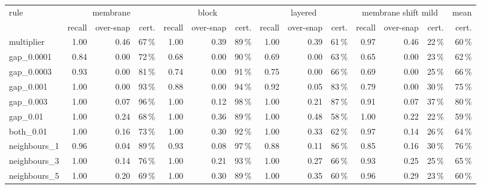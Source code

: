 \begin{tabular}{lrrrrrrrrrrrrr}
\hline
rule & \multicolumn{3}{c}{membrane} & \multicolumn{3}{c}{block} & \multicolumn{3}{c}{layered} & \multicolumn{3}{c}{membrane shift mild} & mean \\
 & recall & over-snap & cert. & recall & over-snap & cert. & recall & over-snap & cert. & recall & over-snap & cert. & cert. \\
\hline
multiplier & 1.00 & 0.46 & 67\,\% & 1.00 & 0.39 & 89\,\% & 1.00 & 0.39 & 61\,\% & 0.97 & 0.46 & 22\,\% & 60\,\% \\
gap\_0.0001 & 0.84 & 0.00 & 72\,\% & 0.68 & 0.00 & 90\,\% & 0.69 & 0.00 & 63\,\% & 0.65 & 0.00 & 23\,\% & 62\,\% \\
gap\_0.0003 & 0.93 & 0.00 & 81\,\% & 0.74 & 0.00 & 91\,\% & 0.75 & 0.00 & 66\,\% & 0.69 & 0.00 & 25\,\% & 66\,\% \\
gap\_0.001 & 1.00 & 0.00 & 93\,\% & 0.88 & 0.00 & 94\,\% & 0.92 & 0.05 & 83\,\% & 0.79 & 0.00 & 30\,\% & 75\,\% \\
gap\_0.003 & 1.00 & 0.07 & 96\,\% & 1.00 & 0.12 & 98\,\% & 1.00 & 0.21 & 87\,\% & 0.91 & 0.07 & 37\,\% & 80\,\% \\
gap\_0.01 & 1.00 & 0.24 & 68\,\% & 1.00 & 0.36 & 89\,\% & 1.00 & 0.48 & 58\,\% & 1.00 & 0.22 & 22\,\% & 59\,\% \\
both\_0.01 & 1.00 & 0.16 & 73\,\% & 1.00 & 0.30 & 92\,\% & 1.00 & 0.33 & 62\,\% & 0.97 & 0.14 & 26\,\% & 64\,\% \\
neighbours\_1 & 0.96 & 0.04 & 89\,\% & 0.93 & 0.08 & 97\,\% & 0.88 & 0.11 & 86\,\% & 0.85 & 0.16 & 30\,\% & 76\,\% \\
neighbours\_3 & 1.00 & 0.14 & 76\,\% & 1.00 & 0.21 & 93\,\% & 1.00 & 0.27 & 66\,\% & 0.93 & 0.25 & 25\,\% & 65\,\% \\
neighbours\_5 & 1.00 & 0.20 & 69\,\% & 1.00 & 0.30 & 89\,\% & 1.00 & 0.35 & 60\,\% & 0.96 & 0.29 & 23\,\% & 60\,\% \\
\hline
\end{tabular}
